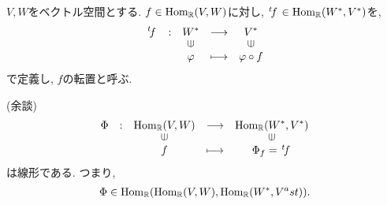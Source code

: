 \begin{definition}
  $V,W$をベクトル空間とする.
  $f\in \operatorname{Hom}_{\mathbb{R}}(V,W)$に対し,
  $\left.^{t}\!f\right.\in \operatorname{Hom}_{\mathbb{R}}(W^\ast,V^\ast)$を,
  \begin{align*}
    \shazo{\transposed{f}}
          {W^\ast}{V^\ast}
          {\varphi}{\varphi\circ f}
  \end{align*}
  で定義し, $f$の転置と呼ぶ.
\end{definition}

(余談)
\begin{align*}
  \shazo{\Phi}
        {\Hom_\RR(V,W)}{\Hom_\RR(W^\ast,V^\ast)}
        {f}{\Phi_f=\transposed{f}}
\end{align*}
は線形である.
つまり,
\begin{align*}
  \Phi\in\operatorname{Hom}_{\mathbb{R}}(\operatorname{Hom}_{\mathbb{R}}(V,W),\operatorname{Hom}_{\mathbb{R}}(W^\ast,V^ast)).
\end{align*}
